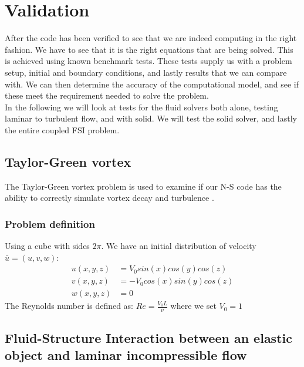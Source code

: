 


\section{Validation}
After the code has been verified to see that we are indeed computing in the right fashion. We have to see that it is the right equations that are being solved. This is achieved using known benchmark tests. These tests supply us with a problem setup, initial and boundary conditions, and lastly results that we can compare with. We can then determine the accuracy of the computational model, and see if these meet the requirement needed to solve the problem. \cite{Selin2014} \\
In the following we will look at tests for the fluid solvers both alone, testing laminar to turbulent flow, and with solid. We will test the solid solver, and lastly the entire coupled FSI problem. 
\subsection{Taylor-Green vortex}
The Taylor-Green vortex problem is used to examine if our N-S code has the ability to correctly simulate vortex decay and turbulence \cite{DeBonis2013}.
\subsubsection{Problem definition}
Using a cube with sides $2\pi$. \newline
We have an initial distribution of velocity $\bar{u} = (u,v,w)$:
\begin{align}
u(x,y,z) &= V_0sin(x)cos(y)cos(z) \\
v(x,y,z) &= - V_0cos(x)sin(y)cos(z)  \\
w(x,y,z) &= 0  
\end{align}
The Reynolds number is defined as: $Re = \frac{V_0 L}{\nu}$ where we set $V_0 = 1$

\subsection{Fluid-Structure Interaction between an elastic object and laminar incompressible flow}


